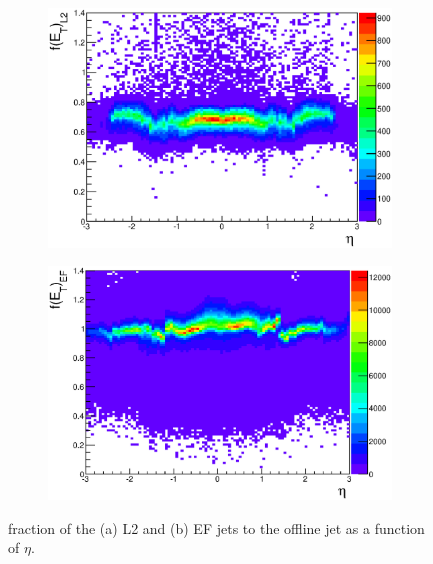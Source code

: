 \begin{figure}
\centering
        \begin{subfigure}[b]{0.5\textwidth}
                \centering
                \includegraphics[width=\textwidth]{figures/ServiceWork/Jets/L2_EtFracEtaMatchedJet.eps}
        \end{subfigure}%
        \begin{subfigure}[b]{0.5\textwidth}
                \centering
                \includegraphics[width=\textwidth]{figures/ServiceWork/Jets/EF_EtFracEtaMatchedJet.eps}
        \end{subfigure}%
\caption[\et{} fraction of L2 and EF jet to offline jet ]{
\et{} fraction of the (a) L2 and (b) EF jets to the offline jet \et{} as a function of $\eta$. 
\label{SW_jet_L2EF_EtFrac_Eta}}

\end{figure}

